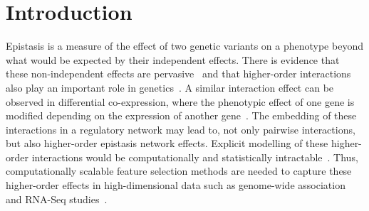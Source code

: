 \documentclass{bioinfo}
\begin{document}

\maketitle

\newpage

\section{Introduction}

Epistasis is a measure of the effect of two genetic variants on a phenotype beyond what would be expected by their independent effects.
There is evidence that these non-independent effects are pervasive~\cite{breen12} and that higher-order interactions also play an important role in genetics~\cite{weinreich13}.
A similar interaction effect can be observed in differential co-expression, where the phenotypic effect of one gene is modified depending on the expression of another gene~\cite{lareau15,diffcoexp10}.
The embedding of these interactions in a regulatory network may lead to, not only pairwise interactions, but also higher-order epistasis network effects.
Explicit modelling of these higher-order interactions would be computationally and statistically intractable~\cite{riesselman18}.
Thus, computationally scalable feature selection methods are needed to capture these higher-order effects in high-dimensional data such as genome-wide association~\cite{titv} and RNA-Seq studies~\cite{stir}.
\end{document}
